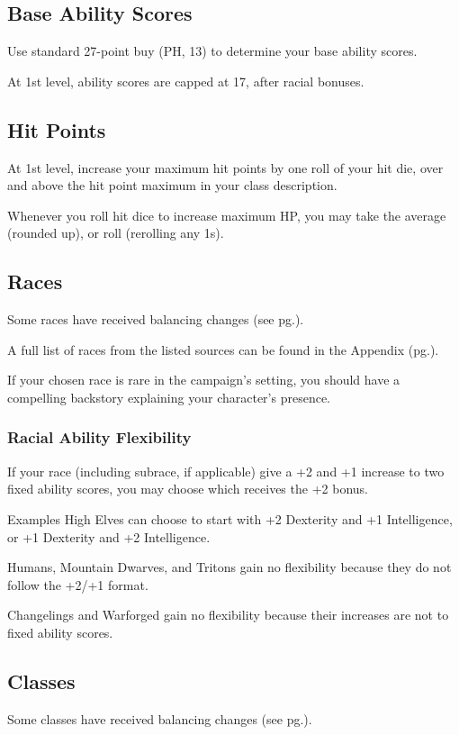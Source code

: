 \documentclass[letterpaper,twocolumn,openany,nodeprecatedcode]{dndbook}
\newcommand{\pg}[1]{pg.\pageref{#1}}
\begin{document}
\subsection{Base Ability Scores}
Use standard 27-point buy (PH, 13) to determine your base ability scores. 

At 1st level, ability scores are capped at 17, after racial bonuses.

\subsection{Hit Points}
At 1st level, increase your maximum hit points by one roll of your hit die, over and above the hit point maximum in your class description.

Whenever you roll hit dice to increase maximum HP, you may take the average (rounded up), or roll (rerolling any 1s).

\subsection{Races}
Some races have received balancing changes (see \pg{balance-races}).

A full list of races from the listed sources can be found in the Appendix (\pg{appendix-races}).

If your chosen race is rare in the campaign's setting, you should have a compelling backstory explaining your character's presence.

\subsubsection{Racial Ability Flexibility}
If your race (including subrace, if applicable) give a +2 and +1 increase to two fixed ability scores, you may choose which receives the +2 bonus.

\begin{DndComment}{Examples}
High Elves can choose to start with +2 Dexterity and +1 Intelligence, or +1 Dexterity and +2 Intelligence. 

Humans, Mountain Dwarves, and Tritons gain no flexibility because they do not follow the +2/+1 format.

Changelings and Warforged gain no flexibility because their increases are not to fixed ability scores.
\end{DndComment}

\subsection{Classes}
Some classes have received balancing changes (see \pg{balance-classes}). 
\end{document}
